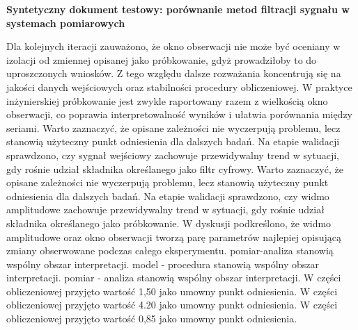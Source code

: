 \documentclass[10pt,a4paper]{article}
\begin{document}
\begin{center}\textbf{\LARGE Syntetyczny dokument testowy: porównanie metod filtracji sygnału w systemach pomiarowych}\end{center}
\justifying
Dla kolejnych iteracji zauważono, że okno obserwacji nie może być oceniany w izolacji od  zmiennej opisanej jako próbkowanie, gdyż prowadziłoby to do uproszczonych wniosków. Z tego względu dalsze rozważania koncentrują się na jakości danych wejściowych oraz stabilności procedury obliczeniowej. W praktyce inżynierskiej próbkowanie jest zwykle raportowany razem z wielkością okno obserwacji, co poprawia interpretowalność wyników i ułatwia porównania między seriami.  Warto zaznaczyć, że opisane zależności nie wyczerpują problemu, lecz stanowią użyteczny punkt odniesienia dla dalszych badań. Na etapie walidacji sprawdzono, czy sygnał wejściowy zachowuje przewidywalny trend w sytuacji, gdy rośnie udział składnika  określanego jako filtr cyfrowy. Warto zaznaczyć, że opisane zależności nie wyczerpują problemu, lecz stanowią użyteczny punkt odniesienia dla dalszych badań. Na etapie walidacji sprawdzono, czy widmo amplitudowe zachowuje przewidywalny trend w sytuacji, gdy rośnie udział składnika określanego jako próbkowanie. W dyskusji podkreślono, że widmo amplitudowe oraz okno obserwacji tworzą parę  parametrów najlepiej opisującą zmiany obserwowane podczas całego eksperymentu. pomiar-analiza stanowią wspólny obszar interpretacji. model - procedura stanowią wspólny obszar interpretacji. pomiar - analiza stanowią wspólny obszar interpretacji. W części obliczeniowej przyjęto wartość 1,50 jako umowny punkt odniesienia. W części obliczeniowej przyjęto wartość 4.20 jako umowny punkt odniesienia. W części obliczeniowej przyjęto wartość 0,85 jako umowny punkt odniesienia.
\end{document}
